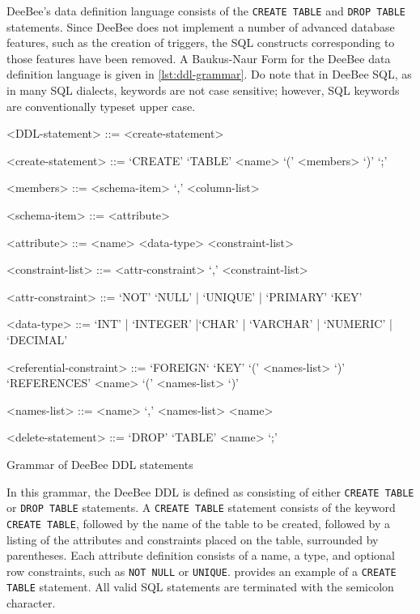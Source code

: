 DeeBee's data definition language consists of the \texttt{CREATE TABLE} and \texttt{DROP TABLE} statements. Since DeeBee does not implement a number of advanced database features, such as the creation of triggers, the SQL constructs corresponding to those features have been removed. A Baukus-Naur Form for the DeeBee data definition language is given in \cref{lst:ddl-grammar}. Do note that in DeeBee SQL, as in many SQL dialects, keywords are not case sensitive; however, SQL keywords are conventionally typeset upper case.
\begin{listing}[h]
\begin{grammar}
<DDL-statement>  ::= <create-statement>
	 \alt <drop-statement>
	 
<create-statement> ::= `CREATE' `TABLE' <name> `(' <members> `)' `;'

<members> ::= <schema-item> `,' <column-list>
	\alt <schema-item>

<schema-item> ::= <attribute>  	 
	
<attribute> ::= <name> <data-type> <constraint-list>

<constraint-list> ::= <attr-constraint> `,' <constraint-list>
	\alt <attr-constraint>
	
<attr-constraint> ::= `NOT' `NULL'  | `UNIQUE' | `PRIMARY' `KEY'

<data-type> ::= `INT'  | `INTEGER'  |`CHAR'  | `VARCHAR'  | `NUMERIC' | `DECIMAL'

<referential-constraint> ::= `FOREIGN` `KEY' `(' <names-list> `)' `REFERENCES'  <name> `(' <names-list> `)'

<names-list> ::= <name> `,' <names-list> \alt <name>

<delete-statement> ::= `DROP' `TABLE' <name> `;'
\end{grammar}
\caption{Grammar of DeeBee DDL statements}
\label{lst:ddl-grammar}
\end{listing}

In this grammar, the DeeBee DDL is defined as consisting of either \texttt{CREATE TABLE} or \texttt{DROP TABLE} statements.  A \texttt{CREATE TABLE} statement consists of the keyword \texttt{CREATE TABLE}, followed by the name of the table to be created, followed by a listing of the attributes and constraints placed on the table, surrounded by parentheses. Each attribute definition consists of a name, a type, and optional row constraints, such as \texttt{NOT NULL} or \texttt{UNIQUE}.  provides an example of a \texttt{CREATE TABLE} statement. All valid SQL statements are terminated with the semicolon character.

